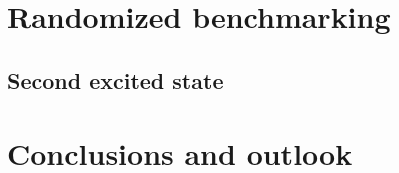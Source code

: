   \chapter{Randomized benchmarking}

    \section{Second excited state}

  \chapter{Conclusions and outlook}
